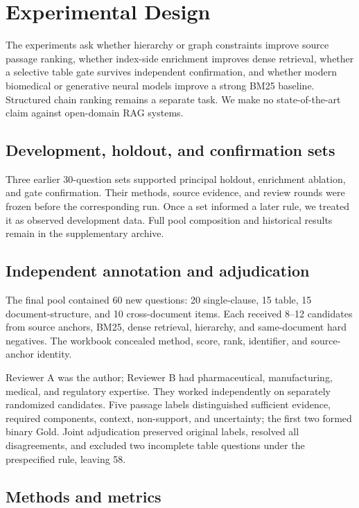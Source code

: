 \section{Experimental Design}
\label{sec:experiments}

The experiments ask whether hierarchy or graph constraints improve source passage ranking, whether index-side enrichment improves dense retrieval, whether a selective table gate survives independent confirmation, and whether modern biomedical or generative neural models improve a strong BM25 baseline. Structured chain ranking remains a separate task. We make no state-of-the-art claim against open-domain RAG systems.

\subsection{Development, holdout, and confirmation sets}

Three earlier 30-question sets supported principal holdout, enrichment ablation, and gate confirmation. Their methods, source evidence, and review rounds were frozen before the corresponding run. Once a set informed a later rule, we treated it as observed development data. Full pool composition and historical results remain in the supplementary archive.

\subsection{Independent annotation and adjudication}

The final pool contained 60 new questions: 20 single-clause, 15 table, 15 document-structure, and 10 cross-document items. Each received 8--12 candidates from source anchors, BM25, dense retrieval, hierarchy, and same-document hard negatives. The workbook concealed method, score, rank, identifier, and source-anchor identity.

Reviewer A was the author; Reviewer B had pharmaceutical, manufacturing, medical, and regulatory expertise. They worked independently on separately randomized candidates. Five passage labels distinguished sufficient evidence, required components, context, non-support, and uncertainty; the first two formed binary Gold. Joint adjudication preserved original labels, resolved all disagreements, and excluded two incomplete table questions under the prespecified rule, leaving 58.

\subsection{Methods and metrics}

